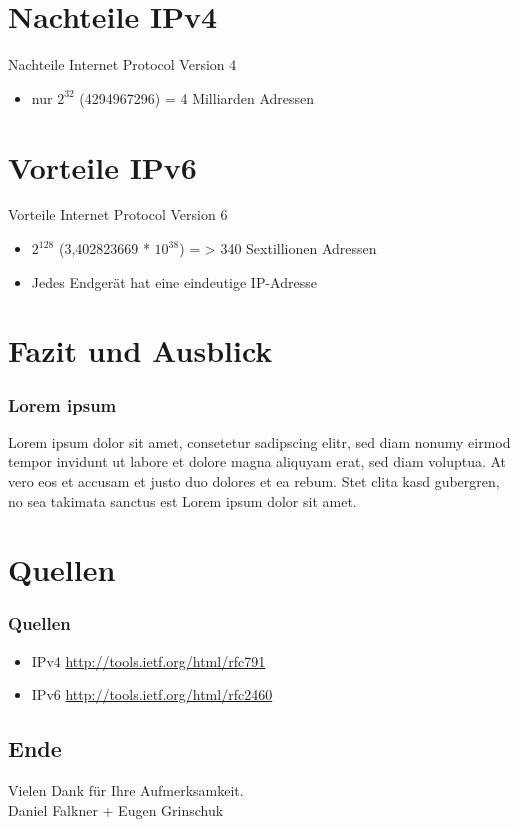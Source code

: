 \documentclass[xcolor=dvipsnames]{beamer}
\newcommand*{\Author}{Daniel Falkner + Eugen Grinschuk} %
\begin{document}

\section{Nachteile IPv4}
\begin{frame}
  \begin{alertblock}{Nachteile Internet Protocol Version 4}
	  \begin{itemize}
  		\item nur $2^{32}$ (4294967296) = 4 Milliarden Adressen
	  \end{itemize}
  \end{alertblock}
\end{frame}

\section{Vorteile IPv6}
\begin{frame}
  \begin{block}{Vorteile Internet Protocol Version 6}
	  \begin{itemize}
  		\item $2^{128}$ (3,402823669 * $10^{38}$) = > 340 Sextillionen Adressen
  		\item Jedes Endgerät hat eine eindeutige IP-Adresse
	  \end{itemize}
  \end{block}
\end{frame}



\section{Fazit und Ausblick}
\begin{frame}
 \frametitle{Lorem ipsum}
  Lorem ipsum dolor sit amet, consetetur sadipscing elitr, sed diam nonumy eirmod tempor invidunt ut labore et dolore magna aliquyam erat, sed diam voluptua. At vero eos et accusam et justo duo dolores et ea rebum. Stet clita kasd gubergren, no sea takimata sanctus est Lorem ipsum dolor sit amet.
\end{frame}

\section{Quellen}
\begin{frame}
 \frametitle{Quellen}
  \begin{block}{}
	  \begin{itemize}
  		\item IPv4 \url{http://tools.ietf.org/html/rfc791}
  		\item IPv6 \url{http://tools.ietf.org/html/rfc2460}
	  \end{itemize}
  \end{block}
\end{frame}

\subsection*{Ende}
\begin{frame}
	\begin{block}{}	
		\begin{center}
			Vielen Dank für Ihre Aufmerksamkeit. \\
			\Author{}
		\end{center}	
	\end{block}
\end{frame}
\end{document}
